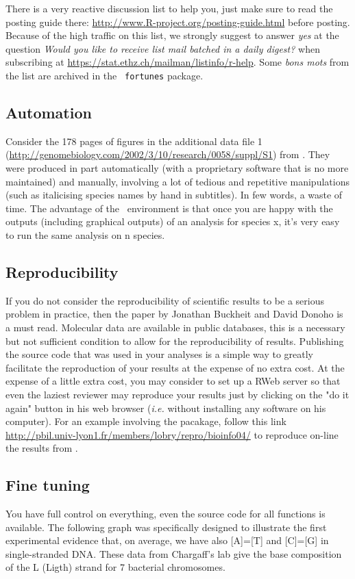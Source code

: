 \documentclass{article}
\begin{document}
There is a very reactive discussion list to help you, just make sure to
read the posting guide there: \url{http://www.R-project.org/posting-guide.html}
before posting. Because of the high traffic on this list, we strongly suggest to answer \emph{yes} at the
question \emph{Would you like to receive list mail batched in a daily  digest?} when
subscribing at \url{https://stat.ethz.ch/mailman/listinfo/r-help}. Some \textit{bons mots}
from the list are archived in the \Rlogo{}~\texttt{fortunes} package.

\subsection{Automation} 
Consider the 178 pages of figures in the additional data file 1
(\url{http://genomebiology.com/2002/3/10/research/0058/suppl/S1}) from \cite{lobrysueoka}. 
They were produced in part automatically (with a proprietary
software that is no more maintained) and manually, involving a lot of
tedious and repetitive manipulations (such as italicising species names by hand in subtitles).
In few words, a waste of time. The advantage of the \Rlogo{}~environment is that once you are
happy with the outputs (including graphical outputs) of an analysis for species x, it's very
easy to run the same analysis on n species. 

\subsection{Reproducibility} 
If you do not consider the reproducibility of scientific results
to be a serious problem in practice, then the paper by Jonathan Buckheit and David Donoho
\cite{repro} is a must read. Molecular data are available in public databases, this is
a necessary but not sufficient condition to allow for the reproducibility of results.
Publishing the \Rlogo{} source code that was used in your analyses is a simple way
to greatly facilitate the reproduction of your results at the expense of no extra cost. 
At the expense of a little extra cost, you may consider to set up a RWeb server
so that even the laziest reviewer may reproduce your results just by clicking on
the "do it again" button in his web browser (\textit{i.e.} without installing any
software on his computer). For an example involving the \seqinr{} pacakage, 
follow this link \url{http://pbil.univ-lyon1.fr/members/lobry/repro/bioinfo04/}
to reproduce on-line the results from \cite{fifine}.

\subsection{Fine tuning} 
You have full control on everything, even the source code
for all functions is available. 
The following graph was specifically designed to illustrate
the first experimental evidence \cite{chargaff} that, on average, we have also [A]=[T] and [C]=[G] 
in single-stranded DNA. These data from Chargaff's lab give the base composition of the L (Ligth) 
strand for 7 bacterial chromosomes.
\end{document}

